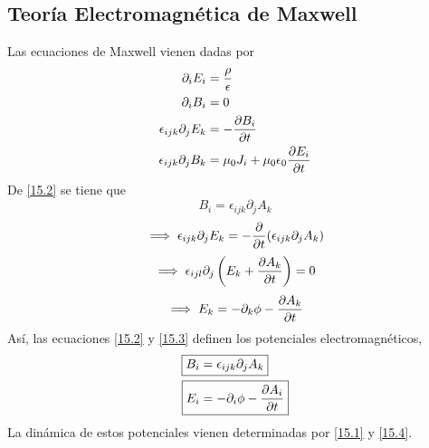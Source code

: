\subsection{Teoría Electromagnética de Maxwell}
Las ecuaciones de Maxwell vienen dadas por
\begin{align}
  \partial_iE_i &=\frac{\rho}{\epsilon}\label{15.1}\\
  \partial_i B_i&=0\label{15.2}\\
  \epsilon_{ijk}\partial_j E_k&=-\pdv{B_i}{t}\label{15.3}\\
  \epsilon_{ijk}\partial_jB_k&=\mu_0 J_i+\mu_0\epsilon_0 \pdv{E_i}{t}\label{15.4}
\end{align}
De \eqref{15.2} se tiene que
\begin{equation}
  B_i=\epsilon_{ijk}\partial_j A_k
\end{equation}
\begin{equation}
  \implies \epsilon_{ijk}\partial_j E_k=-\pdv{t}(\epsilon_{ijk}\partial_j A_k)
\end{equation}
\begin{equation}
  \implies \epsilon_{ijl}\partial_j \left(E_k+\pdv{A_k}{t}\right)=0
\end{equation}
\begin{equation}
  \implies E_k=-\partial_k\phi -\pdv{A_k}{t}
\end{equation}
Así, las ecuaciones \eqref{15.2} y \eqref{15.3} definen los potenciales electromagnéticos, 
\begin{align}
  \Aboxed{B_i&=\epsilon_{ijk}\partial_j A_k}\\
 \Aboxed{ E_i&=-\partial_i\f -\pdv{A_i}{t}}
\end{align}
La dinámica de estos potenciales vienen determinadas por \eqref{15.1} y \eqref{15.4}.

